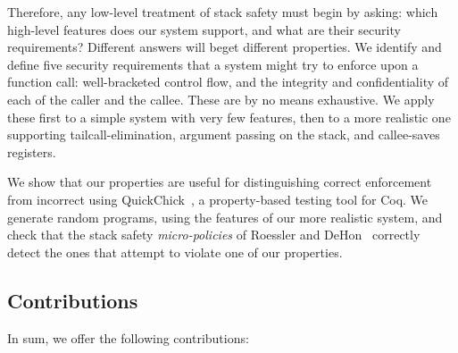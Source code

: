 \documentclass[10pt,conference]{ieeetran}%
\theoremstyle{definition}
\begin{document}
Therefore, any low-level treatment of stack safety must begin by asking:
which high-level features does our system support, and what are their
security requirements? Different answers will beget different properties.
We identify and define five security requirements that a system might try
to enforce upon a function call: well-bracketed control flow, and the
integrity and confidentiality of each of the caller and the callee.
These are by no means exhaustive. We apply these first to a simple system
with very few features, then to a more realistic one supporting
tailcall-elimination, argument passing on the stack, and callee-saves
registers.

We show that our properties are useful for distinguishing correct enforcement
from incorrect using QuickChick~\cite{Denes:VSL2014,Pierce:SF4}, a property-based
testing tool for Coq. We generate random programs, using the features of our
more realistic system, and check that the stack safety {\em micro-policies}
of Roessler and DeHon~\cite{DBLP:conf/sp/RoesslerD18}
correctly detect the ones that attempt to violate one of our properties.


\subsection{Contributions}

In sum, we offer the following contributions:
\end{document}
